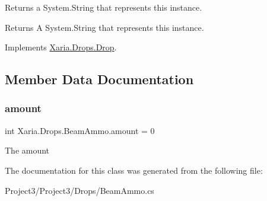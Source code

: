 Returns a System.\+String that represents this instance. 

\begin{DoxyReturn}{Returns}
A System.\+String that represents this instance. 
\end{DoxyReturn}


Implements \hyperlink{classXaria_1_1Drops_1_1Drop_abe25441e5c3fe5b2199352f24bfafa4b}{Xaria.\+Drops.\+Drop}.



\subsection{Member Data Documentation}
\mbox{\label{classXaria_1_1Drops_1_1BeamAmmo_a8f2fd61fca6d287feaee375834a5fe15}} 
\subsubsection{\texorpdfstring{amount}{amount}}
{\footnotesize\ttfamily int Xaria.\+Drops.\+Beam\+Ammo.\+amount = 0}



The amount 



The documentation for this class was generated from the following file\+:\begin{DoxyCompactItemize}
\item 
Project3/\+Project3/\+Drops/Beam\+Ammo.\+cs\end{DoxyCompactItemize}
